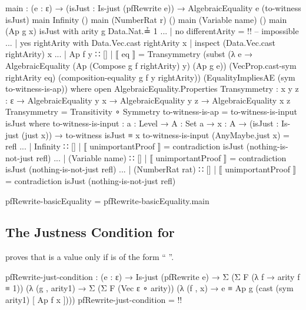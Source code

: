 \documentclass{report}
\begin{document}
\begin{code}
      main : (e : ε) →
             (isJust : Is-just (pfRewrite e)) →
             AlgebraicEquality e (to-witness isJust)
      main Infinity ()
      main (NumberRat r) ()
      main (Variable name) ()
      main (Ap g x) isJust with arity g Data.Nat.≟ 1
      ... | no differentArity = {!!} -- impossible
      ... | yes rightArity with Data.Vec.cast rightArity x
                              | inspect (Data.Vec.cast rightArity) x
      ... | Ap f y ∷ [] | ⟦ eq ⟧ =
            Transymmetry (subst (λ e → AlgebraicEquality (Ap (Compose g f rightArity) y)
                                                         (Ap g e))
                                (VecProp.cast-sym rightArity eq)
                                (composition-equality g f y rightArity))
                         (EqualityImpliesAE (sym to-witness-is-ap))
            where
            open AlgebraicEquality.Properties
            Transymmetry : {x y z : ε} →
                           AlgebraicEquality y x →
                           AlgebraicEquality y z →
                           AlgebraicEquality x z
            Transymmetry = Transitivity ∘ Symmetry
            to-witness-is-ap = to-witness-is-input isJust
              where
              to-witness-is-input :
                {a : Level} →
                {A : Set a} →
                {x : A} →
                (isJust : Is-just (just x)) →
                to-witness isJust ≡ x
              to-witness-is-input (AnyMaybe.just x) = refl
      ... | Infinity ∷ [] | ⟦ unimportantProof ⟧ = contradiction isJust (nothing-is-not-just refl)
      ... | (Variable name) ∷ [] | ⟦ unimportantProof ⟧ = contradiction isJust (nothing-is-not-just refl)
      ... | (NumberRat rat) ∷ [] | ⟦ unimportantProof ⟧ = contradiction isJust (nothing-is-not-just refl)

    pfRewrite-basicEquality = pfRewrite-basicEquality.main
\end{code}

\subsection{The Justness Condition for }
 proves that   is a  value only if  is of the form ``  \AgdaInductiveConstructor{[}    \AgdaInductiveConstructor{]}''.

\begin{code}
    pfRewrite-just-condition :
      (e : ε) →
      Is-just (pfRewrite e) →
      Σ (Σ F (λ f → arity f ≡ 1))
        (λ (g , arity1) →
           Σ (Σ F (Vec ε ∘ arity))
             (λ (f , x) →
                e ≡ Ap g (cast (sym arity1) [ Ap f x ])))
    pfRewrite-just-condition = {!!}
\end{code}
\end{document}
